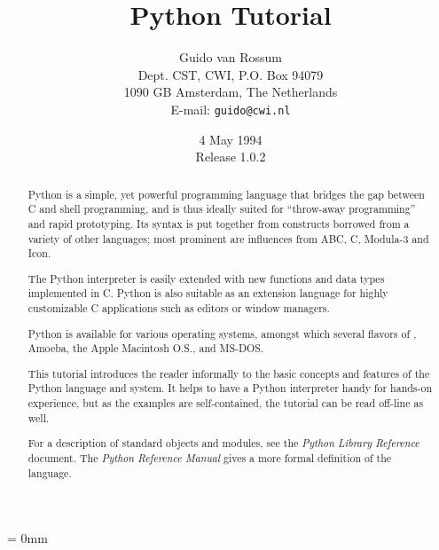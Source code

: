 
\title{Python Tutorial}
        
\author{
        Guido van Rossum \\
        Dept. CST, CWI, P.O. Box 94079 \\
        1090 GB Amsterdam, The Netherlands \\
        E-mail: {\tt guido@cwi.nl}
}

\date{4 May 1994 \\ Release 1.0.2} %




\maketitle

\begin{abstract}

\noindent
Python is a simple, yet powerful programming language that bridges the
gap between C and shell programming, and is thus ideally suited for
``throw-away programming''
and rapid prototyping.  Its syntax is put
together from constructs borrowed from a variety of other languages;
most prominent are influences from ABC, C, Modula-3 and Icon.

The Python interpreter is easily extended with new functions and data
types implemented in C.  Python is also suitable as an extension
language for highly customizable C applications such as editors or
window managers.

Python is available for various operating systems, amongst which
several flavors of {\UNIX}, Amoeba, the Apple Macintosh O.S.,
and MS-DOS.

This tutorial introduces the reader informally to the basic concepts
and features of the Python language and system.  It helps to have a
Python interpreter handy for hands-on experience, but as the examples
are self-contained, the tutorial can be read off-line as well.

For a description of standard objects and modules, see the {\em Python
Library Reference} document.  The {\em Python Reference Manual} gives
a more formal definition of the language.

\end{abstract}

\pagebreak
{
\parskip = 0mm
\tableofcontents
}

\pagebreak

